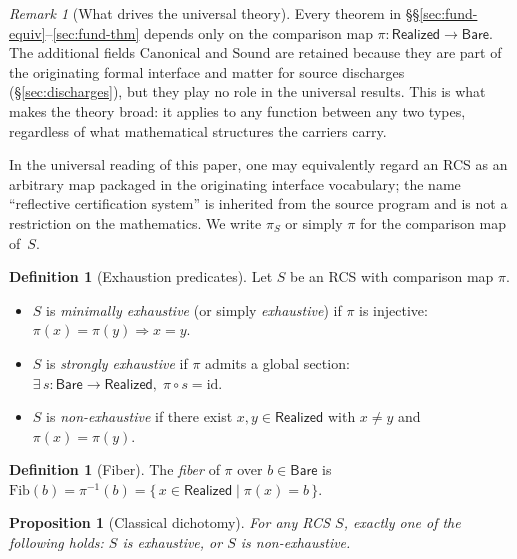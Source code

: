 \documentclass[11pt,a4paper]{article}
\theoremstyle{plain}
\newtheorem{proposition}[theorem]{Proposition}
\theoremstyle{definition}
\newtheorem{definition}[theorem]{Definition}
\theoremstyle{remark}
\newtheorem{remark}[theorem]{Remark}
\newcommand{\Bare}{\mathsf{Bare}}
\newcommand{\Real}{\mathsf{Realized}}
\newcommand{\compare}{\pi}
\newcommand{\Fib}{\mathrm{Fib}}
\begin{document}
\begin{remark}[What drives the universal theory]\label{rem:pi-only}
Every theorem in \S\S\ref{sec:fund-equiv}--\ref{sec:fund-thm} depends only
on the comparison map $\compare : \Real \to \Bare$. The additional fields
$\mathrm{Canonical}$ and $\mathrm{Sound}$ are retained because they are part
of the originating formal interface and matter for source discharges
(\S\ref{sec:discharges}), but they play no role in the universal results.
This is what makes the theory broad: it applies to any function between any
two types, regardless of what mathematical structures the carriers carry.
\end{remark}

In the universal reading of this paper, one may equivalently regard an RCS
as an arbitrary map packaged in the originating interface vocabulary; the
name ``reflective certification system'' is inherited from the source program
and is not a restriction on the mathematics.
We write $\compare_S$ or simply $\compare$ for the comparison map of~$S$.

\begin{definition}[Exhaustion predicates]\label{def:exhaust}
Let $S$ be an RCS with comparison map $\compare$.
\begin{itemize}[nosep]
\item $S$ is \emph{minimally exhaustive} (or simply \emph{exhaustive}) if $\compare$
      is injective: $\compare(x) = \compare(y) \Rightarrow x = y$.
\item $S$ is \emph{strongly exhaustive} if $\compare$ admits a global section:
      $\exists\, s : \Bare \to \Real,\; \compare \circ s = \mathrm{id}$.
\item $S$ is \emph{non-exhaustive} if there exist $x, y \in \Real$ with
      $x \neq y$ and $\compare(x) = \compare(y)$.
\end{itemize}
\end{definition}

\begin{definition}[Fiber]\label{def:fiber}
The \emph{fiber} of $\compare$ over $b \in \Bare$ is
$\Fib(b) = \compare^{-1}(b) = \{\, x \in \Real \mid \compare(x) = b \,\}$.
\end{definition}

\begin{proposition}[Classical dichotomy]\label{prop:dichotomy}
For any RCS $S$, exactly one of the following holds: $S$ is exhaustive, or $S$
is non-exhaustive.
\end{proposition}
\end{document}
